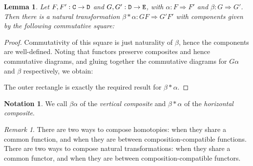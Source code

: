 \documentclass[11 pt]{amsart}
\theoremstyle{plain}   %
\newtheorem{lemma}{Lemma}[section]
\theoremstyle{definition}
\newtheorem{notn}{Notation}[section]
\theoremstyle{remark}
\newtheorem{rem}{Remark}[section]
\numberwithin{equation}{section}
\def\nat{\Rightarrow}
\newcommand{\punctuation}[1]{\makebox[0pt][l]{#1}}
\newcommand{\cat}[1]{{\normalfont\texttt{#1}}}
\begin{document}
\begin{lemma}\label{horizontal composition}
	Let $F,F': \cat{C}\rightarrow\cat{D}$ and $G,G': \cat{D}\rightarrow\cat{E}$,
	with $\alpha: F\nat F'$ and $\beta: G\nat G'$. Then there is a natural
	transformation $\beta*\alpha: GF\nat G'F'$ with components given by the
	following commutative square:
	\begin{figure}[H]
		\centering
	\end{figure}
\end{lemma}

\begin{proof}
	Commutativity of this square is just naturality of $\beta$, hence the
	components are well-defined. Noting that functors preserve composites and
	hence commutative diagrams, and gluing together the commutative diagrams for
	$G\alpha$ and $\beta$ respectively, we obtain:
	\begin{figure}[H]
		\centering
	\end{figure}
	The outer rectangle is exactly the required result for $\beta*\alpha$.
\end{proof}

\begin{notn}
	We call $\beta\alpha$ of  the \emph{vertical
		composite} and $\beta*\alpha$ of  the
	\emph{horizontal composite}.
\end{notn}

\begin{rem}
	There are two ways to compose homotopies: when they share a common function,
	and when they are between composition-compatible functions. There are two ways
	to compose natural transformations: when they share a common functor, and when
	they are between composition-compatible functors.
\end{rem}
\end{document}
